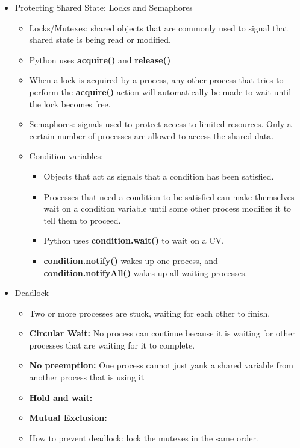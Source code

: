 \documentclass[letterpaper,english,12pt]{article}
\begin{document}
\begin{itemize}
\begin{itemize}
\begin{itemize}
				\end{itemize}
		\end{itemize}
	\item Protecting Shared State: Locks and Semaphores
		\begin{itemize}
			\item Locks/Mutexes: shared objects that are commonly used to signal that shared state is being read or modified.
			\item Python uses \textbf{acquire()} and \textbf{release()}
			\item When a lock is acquired by a process, any other process that tries to perform the \textbf{acquire()} action will automatically be made to wait until the lock becomes free.
			\item Semaphores: signals used to protect access to limited resources. Only a certain number of processes are allowed to access the shared data.

			\item Condition variables:
				\begin{itemize}
					\item Objects that act as signals that a condition has been satisfied.
					\item Processes that need a condition to be satisfied can make themselves wait on a condition variable until some other process modifies it to tell them to proceed.
					\item Python uses \textbf{condition.wait()} to wait on a CV.
					\item \textbf{condition.notify()} wakes up one process, and \textbf{condition.notifyAll()} wakes up all waiting processes.
				\end{itemize}
		\end{itemize}
	\item Deadlock
		\begin{itemize}
			\item Two or more processes are stuck, waiting for each other to finish.
			\item \textbf{Circular Wait: } No process can continue because it is waiting for other processes that are waiting for it to complete.
			\item \textbf{No preemption: } One process cannot just yank a shared variable from another process that is using it
			\item \textbf{Hold and wait: }
			\item \textbf{Mutual Exclusion: }
			\item How to prevent deadlock: lock the mutexes in the same order.
		\end{itemize}
\end{itemize}
			
\end{document}
